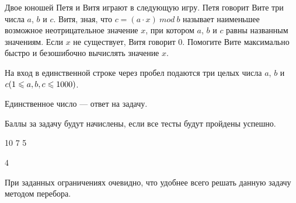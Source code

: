 
Двое юношей Петя и Витя играют в следующую игру. Петя говорит Вите три числа $a$, $b$ и $c$. Витя, зная, что $c = (a \cdot x)\: mod\: b$  
называет наименьшее возможное неотрицательное значение $x$, при котором $a$, $b$ и $c$ равны названным значениям. 
Если $x$ не существует, Витя говорит $0$. Помогите Вите максимально быстро и безошибочно вычислять значение $x$.


На вход в единственной строке через пробел подаются три целых числа $a$, $b$ и $c\space (1 \leq a, b, c \leq 1000)$.

\outputfmtSection

Единственное число — ответ на задачу.

\markSection

Баллы за задачу будут начислены, если все тесты будут пройдены успешно.


\begin{myverbbox}[\small]{\vinput}
    10 7 5
\end{myverbbox}
\begin{myverbbox}[\small]{\voutput}
    4
\end{myverbbox}

\solutionSection

При заданных ограничениях очевидно, что удобнее всего решать данную задачу методом перебора.

